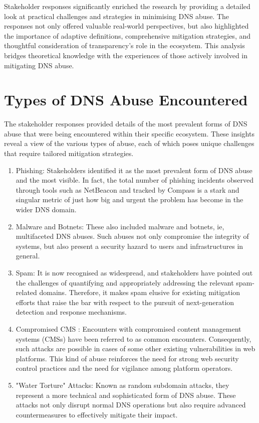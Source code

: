 Stakeholder responses significantly enriched the research by providing a detailed look at practical challenges and strategies in minimising DNS abuse. The responses not only offered valuable real-world perspectives, but also highlighted the importance of adaptive definitions, comprehensive mitigation strategies, and thoughtful consideration of transparency's role in the ecosystem. This analysis bridges theoretical knowledge with the experiences of those actively involved in mitigating DNS abuse.

\section{Types of DNS Abuse Encountered} 

The stakeholder responses provided details of the most prevalent forms of DNS abuse that were being encountered within their specific ecosystem. These insights reveal a view of the various types of abuse, each of which poses unique challenges that require tailored mitigation strategies.

\begin{enumerate}
    \item Phishing: Stakeholders identified it as the most prevalent form of DNS abuse and the most visible. In fact, the total number of phishing incidents observed through tools such as NetBeacon and tracked by Compass is a stark and singular metric of just how big and urgent the problem has become in the wider DNS domain.
    \item Malware and Botnets: These also included malware and botnets, ie, multifaceted DNS abuses. Such abuses not only compromise the integrity of systems, but also present a security hazard to users and infrastructures in general.
    \item Spam: It is now recognised as widespread, and stakeholders have pointed out the challenges of quantifying and appropriately addressing the relevant spam-related domains. Therefore, it makes spam elusive for existing mitigation efforts that raise the bar with respect to the pursuit of next-generation detection and response mechanisms.
    \item Compromised CMS : Encounters with compromised content management systems (CMSs) have been referred to as common encounters. Consequently, such attacks are possible in cases of some other existing vulnerabilities in web platforms. This kind of abuse reinforces the need for strong web security control practices and the need for vigilance among platform operators.
    \item "Water Torture" Attacks: Known as random subdomain attacks, they represent a more technical and sophisticated form of DNS abuse. These attacks not only disrupt normal DNS operations but also require advanced countermeasures to effectively mitigate their impact.
\end{enumerate}

